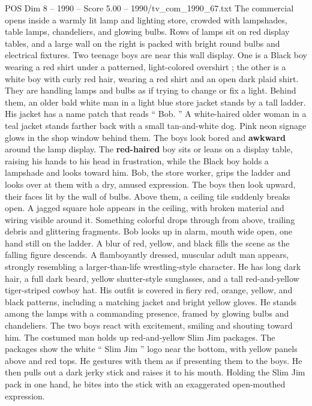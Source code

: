 \begin{textsample}{POS Dim 8 – 1990 – Score 5.00 – 1990/tv\_com\_1990\_67.txt}  \label{ex:f8_pos_066}
The commercial opens inside a warmly lit lamp and lighting store, crowded with lampshades, table lamps, chandeliers, and glowing bulbs.
Rows of lamps sit on red display tables, and a large wall on the right is packed with bright round bulbs and electrical fixtures.
Two teenage boys are near this wall display.
One is a Black boy wearing a red shirt under a patterned, light-colored overshirt ; the other is a white boy with curly red hair, wearing a red shirt and an open dark plaid shirt.
They are handling lamps and bulbs as if trying to change or fix a light.
Behind them, an older bald white man in a light blue store jacket stands by a tall ladder.
His jacket has a name patch that reads “ Bob. ” A white-haired older woman in a teal jacket stands farther back with a small tan-and-white dog.
Pink neon signage glows in the shop window behind them.
The boys look bored and \textbf{awkward} around the lamp display.
The \textbf{red-haired} boy sits or leans on a display table, raising his hands to his head in frustration, while the Black boy holds a lampshade and looks toward him.
Bob, the store worker, grips the ladder and looks over at them with a dry, amused expression.
The boys then look upward, their faces lit by the wall of bulbs.
Above them, a ceiling tile suddenly breaks open.
A jagged square hole appears in the ceiling, with broken material and wiring visible around it.
Something colorful drops through from above, trailing debris and glittering fragments.
Bob looks up in alarm, mouth wide open, one hand still on the ladder.
A blur of red, yellow, and black fills the scene as the falling figure descends.
A flamboyantly dressed, muscular adult man appears, strongly resembling a larger-than-life wrestling-style character.
He has long dark hair, a full dark beard, yellow shutter-style sunglasses, and a tall red-and-yellow tiger-striped cowboy hat.
His outfit is covered in fiery red, orange, yellow, and black patterns, including a matching jacket and bright yellow gloves.
He stands among the lamps with a commanding presence, framed by glowing bulbs and chandeliers.
The two boys react with excitement, smiling and shouting toward him.
The costumed man holds up red-and-yellow Slim Jim packages.
The packages show the white “ Slim Jim ” logo near the bottom, with yellow panels above and red tops.
He gestures with them as if presenting them to the boys.
He then pulls out a dark jerky stick and raises it to his mouth.
Holding the Slim Jim pack in one hand, he bites into the stick with an exaggerated open-mouthed expression.

\end{textsample}
